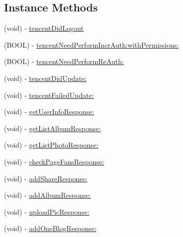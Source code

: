 \subsection*{Instance Methods}
\begin{DoxyCompactItemize}
\item 
(void) -\/ \mbox{\hyperlink{protocol_tencent_session_delegate-p_aa7032a93d9fac4228335c592a5cdefeb}{tencent\+Did\+Logout}}
\item 
(B\+O\+OL) -\/ \mbox{\hyperlink{protocol_tencent_session_delegate-p_a0e01d339c87d58e9386068abd18fc93b}{tencent\+Need\+Perform\+Incr\+Auth\+:with\+Permissions\+:}}
\item 
(B\+O\+OL) -\/ \mbox{\hyperlink{protocol_tencent_session_delegate-p_af961aa9926514b095a51a3dfa8514a38}{tencent\+Need\+Perform\+Re\+Auth\+:}}
\item 
(void) -\/ \mbox{\hyperlink{protocol_tencent_session_delegate-p_ab6add86989fc2acf54c93c6adb7e445e}{tencent\+Did\+Update\+:}}
\item 
(void) -\/ \mbox{\hyperlink{protocol_tencent_session_delegate-p_aa62f3774c40da79bd17aff01b4745518}{tencent\+Failed\+Update\+:}}
\item 
(void) -\/ \mbox{\hyperlink{protocol_tencent_session_delegate-p_a9cff2e12ed27916e865c8048ee0c176c}{get\+User\+Info\+Response\+:}}
\item 
(void) -\/ \mbox{\hyperlink{protocol_tencent_session_delegate-p_a51e1be4e15865ec6c54748596fffd5df}{get\+List\+Album\+Response\+:}}
\item 
(void) -\/ \mbox{\hyperlink{protocol_tencent_session_delegate-p_a9730f3fa053bd0a0d0d6ab2ec8692671}{get\+List\+Photo\+Response\+:}}
\item 
(void) -\/ \mbox{\hyperlink{protocol_tencent_session_delegate-p_a3180b739637e48ae4c986eb98caa3307}{check\+Page\+Fans\+Response\+:}}
\item 
(void) -\/ \mbox{\hyperlink{protocol_tencent_session_delegate-p_a216d645eacd9b1e25a941ba53dc1ee02}{add\+Share\+Response\+:}}
\item 
(void) -\/ \mbox{\hyperlink{protocol_tencent_session_delegate-p_a065feaea11a1a1ec423a85859b36a0c5}{add\+Album\+Response\+:}}
\item 
(void) -\/ \mbox{\hyperlink{protocol_tencent_session_delegate-p_ae464b20ef11dd5fbed06862bcbe2f7d2}{upload\+Pic\+Response\+:}}
\item 
(void) -\/ \mbox{\hyperlink{protocol_tencent_session_delegate-p_a3ba2a0c6a9f2444218b6acef8daf30d6}{add\+One\+Blog\+Response\+:}}
\item 

\end{DoxyCompactItemize}
